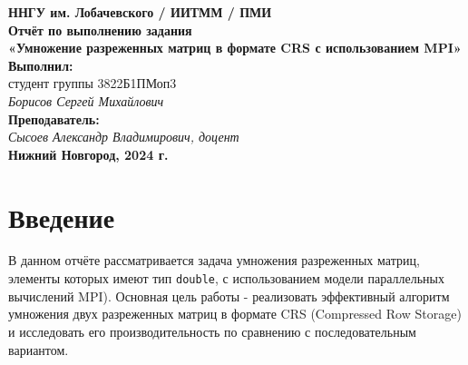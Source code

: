 \documentclass[12pt]{article}
\begin{document}
\begin{titlepage}
    \begin{center}
        \large 
        \textbf{ННГУ им. Лобачевского / ИИТММ / ПМИ}\\[0.5cm]

        \vspace{4cm}
        \textbf{\Large Отчёт по выполнению задания}\\
        \textbf{\large «Умножение разреженных матриц в формате CRS с использованием MPI»}\\[3cm]

        \vspace{3cm}
        \textbf{Выполнил:}\\
        студент группы 3822Б1ПМоп3 \\
        \textit{Борисов Сергей Михайлович}\\[1cm]

        \textbf{Преподаватель:}\\
        \textit{Сысоев Александр Владимирович, доцент}\\[2cm]

        \vfill
        \textbf{Нижний Новгород, 2024 г.}
    \end{center}
\end{titlepage}

\tableofcontents
\newpage

\section*{Введение}

В данном отчёте рассматривается задача умножения разреженных матриц, элементы которых имеют тип \texttt{double}, с использованием модели параллельных вычислений MPI). 
Основная цель работы - реализовать эффективный алгоритм умножения двух разреженных матриц в формате CRS (Compressed Row Storage) и исследовать его производительность по сравнению с последовательным вариантом.
\end{document}

